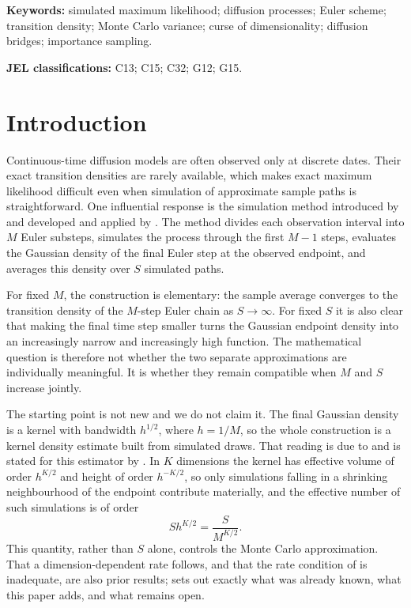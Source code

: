 \documentclass[11pt]{article}
\theoremstyle{definition}
\begin{document}
\begin{abstract}
\end{abstract}

\noindent\textbf{Keywords:} simulated maximum likelihood; diffusion processes; Euler scheme; transition density; Monte Carlo variance; curse of dimensionality; diffusion bridges; importance sampling.

\noindent\textbf{JEL classifications:} C13; C15; C32; G12; G15.

\section{Introduction}

Continuous-time diffusion models are often observed only at discrete dates. Their exact transition densities are rarely available, which makes exact maximum likelihood difficult even when simulation of approximate sample paths is straightforward. One influential response is the simulation method introduced by \citet{Pedersen1995a,Pedersen1995b} and developed and applied by \citet{BrandtSantaClara2002}. The method divides each observation interval into $M$ Euler substeps, simulates the process through the first $M-1$ steps, evaluates the Gaussian density of the final Euler step at the observed endpoint, and averages this density over $S$ simulated paths.

For fixed $M$, the construction is elementary: the sample average converges to the transition density of the $M$-step Euler chain as $S\to\infty$. For fixed $S$ it is also clear that making the final time step smaller turns the Gaussian endpoint density into an increasingly narrow and increasingly high function. The mathematical question is therefore not whether the two separate approximations are individually meaningful. It is whether they remain compatible when $M$ and $S$ increase jointly.

The starting point is not new and we do not claim it. The final Gaussian density is a kernel with bandwidth $h^{1/2}$, where $h=1/M$, so the whole construction is a kernel density estimate built from simulated draws. That reading is due to \citet{MilsteinEtAl2004} and is stated for this estimator by \citet{DetempleGarciaRindisbacher2006}. In $K$ dimensions the kernel has effective volume of order $h^{K/2}$ and height of order $h^{-K/2}$, so only simulations falling in a shrinking neighbourhood of the endpoint contribute materially, and the effective number of such simulations is of order
\[
S h^{K/2}=\frac{S}{M^{K/2}}.
\]
This quantity, rather than $S$ alone, controls the Monte Carlo approximation. That a dimension-dependent rate follows, and that the rate condition of \citet{BrandtSantaClara2002} is inadequate, are also prior results;  sets out exactly what was already known, what this paper adds, and what remains open.
\end{document}
